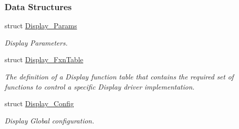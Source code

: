 \subsubsection*{Data Structures}
\begin{DoxyCompactItemize}
\item 
struct \hyperlink{struct_display___params}{Display\+\_\+\+Params}
\begin{DoxyCompactList}\small\item\em Display Parameters. \end{DoxyCompactList}\item 
struct \hyperlink{struct_display___fxn_table}{Display\+\_\+\+Fxn\+Table}
\begin{DoxyCompactList}\small\item\em The definition of a Display function table that contains the required set of functions to control a specific Display driver implementation. \end{DoxyCompactList}\item 
struct \hyperlink{struct_display___config}{Display\+\_\+\+Config}
\begin{DoxyCompactList}\small\item\em Display Global configuration. \end{DoxyCompactList}\end{DoxyCompactItemize}
